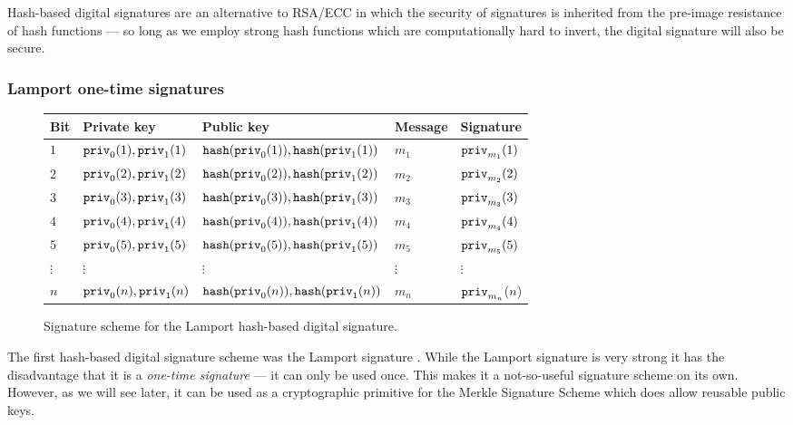 Hash-based digital signatures are an alternative to RSA/ECC in which the security of signatures is inherited from the pre-image resistance of hash functions --- so long as we employ strong hash functions which are computationally hard to invert, the digital signature will also be secure.

\subsubsection{Lamport one-time signatures} \label{lamport-one-time-signatures}

\begin{figure}[!htb]
\begin{tabular}{|l|l|l|l|l|}
\hline
\textbf{Bit} & \textbf{Private key} & \textbf{Public key} & \textbf{Message} & \textbf{Signature} \\
\hline
\hline
$1$ & ${\tt priv}_0(1),{\tt priv}_1(1)$ & ${\tt hash}({\tt priv}_0(1)),{\tt hash}({\tt priv}_1(1))$ & $m_1$ & ${\tt priv}_{m_1}(1)$ \\
$2$ & ${\tt priv}_0(2),{\tt priv}_1(2)$ & ${\tt hash}({\tt priv}_0(2)),{\tt hash}({\tt priv}_1(2))$ & $m_2$ & ${\tt priv}_{m_2}(2)$ \\
$3$ & ${\tt priv}_0(3),{\tt priv}_1(3)$ & ${\tt hash}({\tt priv}_0(3)),{\tt hash}({\tt priv}_1(3))$ & $m_3$ & ${\tt priv}_{m_3}(3)$ \\
$4$ & ${\tt priv}_0(4),{\tt priv}_1(4)$ & ${\tt hash}({\tt priv}_0(4)),{\tt hash}({\tt priv}_1(4))$ & $m_4$ & ${\tt priv}_{m_4}(4)$ \\
$5$ & ${\tt priv}_0(5),{\tt priv}_1(5)$ & ${\tt hash}({\tt priv}_0(5)),{\tt hash}({\tt priv}_1(5))$ & $m_5$ & ${\tt priv}_{m_5}(5)$ \\
$\vdots$ & $\vdots$ & $\vdots$ & $\vdots$ & $\vdots$ \\
$n$ & ${\tt priv}_0(n),{\tt priv}_1(n)$ & ${\tt hash}({\tt priv}_0(n)),{\tt hash}({\tt priv}_1(n))$ & $m_n$ & ${\tt priv}_{m_n}$($n$) \\
\hline
\end{tabular}
\caption{Signature scheme for the Lamport hash-based digital signature.} \label{fig:Lamport_sig}
\end{figure}

The first hash-based digital signature scheme was the Lamport signature \cite{bib:lamport1979constructing}. While the Lamport signature is very strong it has the disadvantage that it is a \emph{one-time signature} --- it can only be used once. This makes it a not-so-useful signature scheme on its own. However, as we will see later, it can be used as a cryptographic primitive for the Merkle Signature Scheme which does allow reusable public keys.

